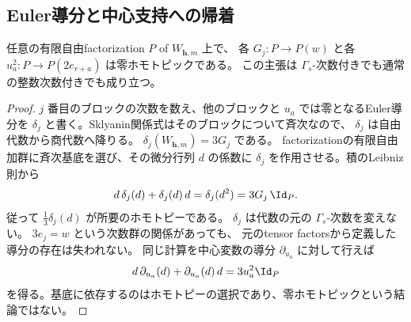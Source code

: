 \subsection{Euler導分と中心支持への帰着}

\begin{lemma}[ブロックpotentialの零ホモトピー]\label{lem:block-euler}
 任意の有限自由factorization \(P\) of \(W_{\mathbf h,m}\) 上で、
 各 \(G_j:P\to P(w)\) と各 \(u_a^2:P\to P(2e_{r+a})\) は零ホモトピックである。
 この主張は \(\Gamma_s\)-次数付きでも通常の整数次数付きでも成り立つ。
\end{lemma}
\begin{proof}
 \(j\) 番目のブロックの次数を数え、他のブロックと \(u_a\) では零となるEuler導分を
 \(\delta_j\) と書く。Sklyanin関係式はそのブロックについて斉次なので、
 \(\delta_j\) は自由代数から商代数へ降りる。
 \(\delta_j(W_{\mathbf h,m})=3G_j\) である。
 factorizationの有限自由加群に斉次基底を選び、その微分行列 \(d\) の係数に
 \(\delta_j\) を作用させる。積のLeibniz則から
 \[
 d\,\delta_j(d)+\delta_j(d)\,d
 =\delta_j(d^2)
 =3G_j\,\Id_P.
 \]
 従って \(\frac13\delta_j(d)\) が所要のホモトピーである。
 \(\delta_j\) は代数の元の \(\Gamma_s\)-次数を変えない。
 \(3e_j=w\) という次数群の関係があっても、
 元のtensor factorsから定義した導分の存在は失われない。
 同じ計算を中心変数の導分 \(\partial_{u_a}\) に対して行えば
 \[
 d\,\partial_{u_a}(d)+\partial_{u_a}(d)\,d=3u_a^2\Id_P
 \]
 を得る。基底に依存するのはホモトピーの選択であり、零ホモトピックという結論ではない。
\end{proof}

